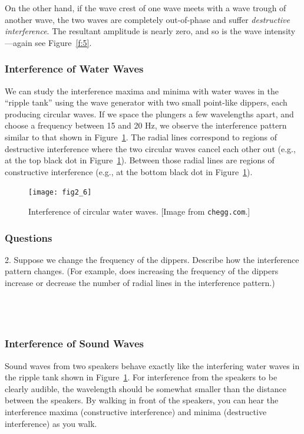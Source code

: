 \documentclass[11pt]{NSF}
\begin{document}
On the other hand, if the wave crest of one wave meets with a wave trough of
another wave, the two waves are completely out-of-phase and suffer 
{\em destructive interference}. The resultant amplitude is nearly zero, and so is the wave
intensity---again see Figure~\ref{f:5}.


\subsubsection{Interference of Water Waves}

We can study the interference maxima and minima with water waves in the 
``ripple tank” using the wave generator with two small point-like dippers, 
each producing circular waves. 
If we space the plungers a few wavelengths apart, and choose a 
frequency between 15 and 20 Hz, we observe the interference pattern
similar to that shown in Figure~\ref{f:6}.
The radial lines correspond to regions of destructive interference
where the two circular waves cancel each other out (e.g., at the top 
black dot in Figure~\ref{f:6}).
Between those radial lines are regions of constructive interference
(e.g., at the bottom black dot in Figure~\ref{f:6}).
%
\begin{figure}[hbtp]
\begin{center}
\texttt{[image: fig2\_6]}
\caption{Interference of circular water waves.
[Image from {\tt chegg.com}.]}
\label{f:6}
\end{center}
\end{figure}
%

\subsubsection*{Questions}

2.	 Suppose we change the frequency of the dippers.
Describe how the interference pattern changes.
(For example, does increasing the frequency of the 
dippers increase or decrease the number of radial 
lines in the interference pattern.)
\\
\\
\\
\\

\subsubsection{Interference of Sound Waves}

Sound waves from two speakers behave exactly like the 
interfering water waves in the ripple tank shown
in Figure~\ref{f:6}.
For interference from the speakers to be clearly audible, 
the wavelength should be somewhat smaller than the distance between the speakers.
By walking in front of the speakers, you can hear the
interference maxima (constructive interference) and 
minima (destructive interference) as you walk.
\end{document}
